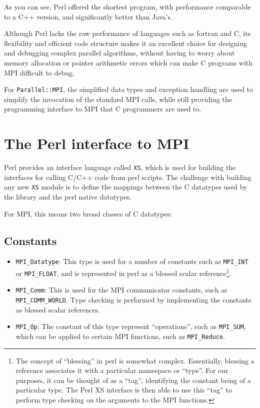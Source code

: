 \documentclass{report}
\begin{document}
As you can see, Perl offered the shortest program, with performance
comparable to a C++ version, and significantly better than Java's.

Although Perl lacks the raw performance of languages such as fortran
and C, its flexibility and efficient code structure makes it an
excellent choice for designing and debugging complex parallel
algorithms, without having to worry about memory allocation or pointer 
arithmetic errors which can make C programs with MPI difficult to debug.

For \verb|Parallel::MPI|, the simplified data types and exception
handling are used to simplify the invocation of the standard MPI
calls, while still providing the programming interface to MPI that C
programmers are used to.

\section*{The Perl interface to MPI}

Perl provides an interface language called \verb|XS|, which is used
for building the interfaces for calling C/C++ code from perl scripts.
The challenge with building any new \verb|XS| module is to define the
mappings between the C datatypes used by the library and the perl
native datatypes.

For MPI, this means two broad classes of C datatypes:

\subsection*{Constants} %
     \begin{itemize}
     \item \verb|MPI_Datatype|:  This type is used for a number of
constants such as \verb|MPI_INT| or \verb|MPI_FLOAT|, and is
represented in perl as a blessed scalar reference\footnote{The concept of
``blessing'' in perl is somewhat complex.  Essentially, blessing a
reference associates it with a particular namespace or ``type''.   For
our purposes, it can be thought of as a ``tag'', identifying the
constant being of a particular type.  The Perl XS interface is then
able to use this ``tag'' to perform type checking on the arguments to the
MPI functions. }. 
  
     \item \verb|MPI_Comm|: This is used for the MPI communicator
constants, such as \verb|MPI_COMM_WORLD|.  Type checking is performed
by implementing the constants as blessed scalar references.

     \item \verb|MPI_Op|: The constant of this type represent
``operations'', such as \verb|MPI_SUM|, which can be applied to
certain MPI functions, such as \verb|MPI_Reduce|.
     \end{itemize}
\end{document}
